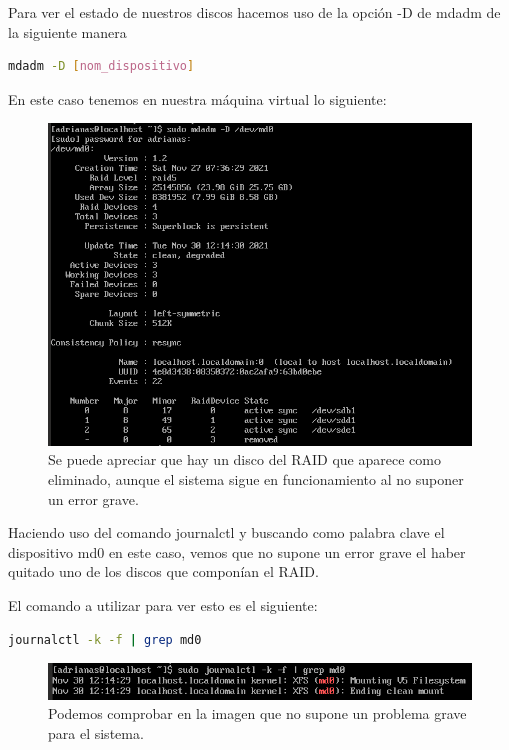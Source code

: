Para ver el estado de nuestros discos hacemos uso de la opción -D de mdadm de la siguiente manera

\begin{lstlisting}[language=bash]
	mdadm -D [nom_dispositivo]
\end{lstlisting}

En este caso tenemos en nuestra máquina virtual lo siguiente:

\begin{figure}[H]
	\centering
	\includegraphics[scale=0.4]{graphics/img1}
	\caption{Se puede apreciar que hay un disco del RAID que aparece como eliminado, aunque el sistema sigue en funcionamiento al no suponer un error grave.}
\end{figure}

Haciendo uso del comando journalctl y buscando como palabra clave el dispositivo md0 en este caso, vemos que no supone un error grave el haber quitado uno de los discos que componían el RAID.

El comando a utilizar para ver esto es el siguiente:

\begin{lstlisting}[language=bash]
	journalctl -k -f | grep md0
\end{lstlisting}

\begin{figure}[H]
	\centering
	\includegraphics[scale=0.4]{graphics/img2}
	\caption{Podemos comprobar en la imagen que no supone un problema grave para el sistema.}
\end{figure}

